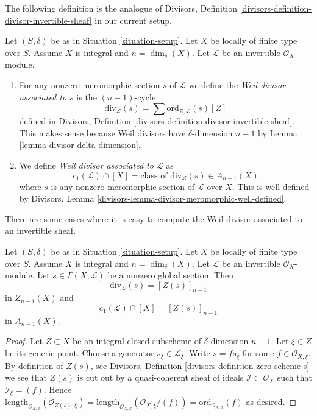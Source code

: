 \noindent
The following definition is the analogue of
Divisors, Definition \ref{divisors-definition-divisor-invertible-sheaf}
in our current setup.

\begin{definition}
\label{definition-divisor-invertible-sheaf}
Let $(S, \delta)$ be as in Situation \ref{situation-setup}.
Let $X$ be locally of finite type over $S$. Assume $X$ is
integral and $n = \dim_\delta(X)$.
Let $\mathcal{L}$ be an invertible $\mathcal{O}_X$-module.
\begin{enumerate}
\item For any nonzero meromorphic section $s$ of $\mathcal{L}$
we define the {\it Weil divisor associated to $s$} is the
$(n - 1)$-cycle
$$
\text{div}_\mathcal{L}(s) =
\sum \text{ord}_{Z, \mathcal{L}}(s) [Z]
$$
defined in Divisors, Definition
\ref{divisors-definition-divisor-invertible-sheaf}.
This makes sense because Weil divisors have $\delta$-dimension $n - 1$
by Lemma \ref{lemma-divisor-delta-dimension}.
\item We define {\it Weil divisor associated to $\mathcal{L}$} as
$$
c_1(\mathcal{L}) \cap [X] =
\text{class of }\text{div}_\mathcal{L}(s) \in A_{n - 1}(X)
$$
where $s$ is any nonzero meromorphic section of $\mathcal{L}$ over
$X$. This is well defined by
Divisors, Lemma \ref{divisors-lemma-divisor-meromorphic-well-defined}.
\end{enumerate}
\end{definition}

\noindent
There are some cases where it is easy to compute the
Weil divisor associated to an invertible sheaf.

\begin{lemma}
\label{lemma-compute-c1}
Let $(S, \delta)$ be as in Situation \ref{situation-setup}.
Let $X$ be locally of finite type over $S$. Assume $X$ is
integral and $n = \dim_\delta(X)$.
Let $\mathcal{L}$ be an invertible $\mathcal{O}_X$-module.
Let $s \in \Gamma(X, \mathcal{L})$ be a nonzero global section.
Then
$$
\text{div}_\mathcal{L}(s) = [Z(s)]_{n - 1}
$$
in $Z_{n - 1}(X)$ and
$$
c_1(\mathcal{L}) \cap [X] = [Z(s)]_{n - 1}
$$
in $A_{n - 1}(X)$.
\end{lemma}

\begin{proof}
Let $Z \subset X$ be an integral closed subscheme of
$\delta$-dimension $n - 1$. Let $\xi \in Z$ be its generic
point. Choose a generator $s_\xi \in \mathcal{L}_\xi$.
Write $s = fs_\xi$ for some $f \in \mathcal{O}_{X, \xi}$.
By definition of $Z(s)$, see
Divisors, Definition \ref{divisors-definition-zero-scheme-s}
we see that $Z(s)$ is cut out by a quasi-coherent
sheaf of ideals $\mathcal{I} \subset \mathcal{O}_X$ such
that $\mathcal{I}_\xi = (f)$. Hence
$\text{length}_{\mathcal{O}_{X, x}}(\mathcal{O}_{Z(s), \xi})
=
\text{length}_{\mathcal{O}_{X, x}}(\mathcal{O}_{X, \xi}/(f))
=
\text{ord}_{\mathcal{O}_{X, x}}(f)$ as desired.
\end{proof}

